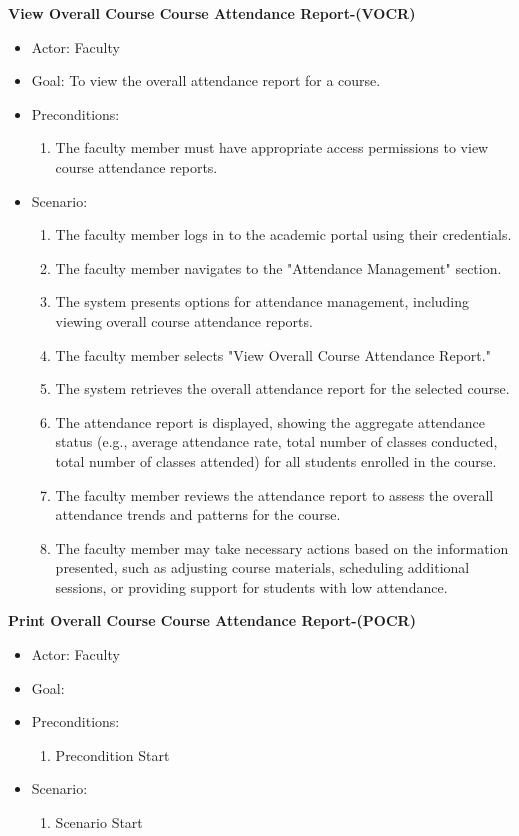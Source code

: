 \documentclass[letterpaper,12pt,oneside,listof=totoc]{scrreprt}
\begin{document}
\hfill \break
\textbf{View Overall Course Course Attendance Report-(VOCR)}
\begin{itemize}
    \item Actor: Faculty
    \item Goal: To view the overall attendance report for a course.
    \item Preconditions:
    \begin{enumerate}
        \item The faculty member must have appropriate access permissions to view course attendance reports.
    \end{enumerate}
    \item Scenario:
    \begin{enumerate}
        \item The faculty member logs in to the academic portal using their credentials.
        \item The faculty member navigates to the "Attendance Management" section.
        \item The system presents options for attendance management, including viewing overall course attendance reports.
        \item The faculty member selects "View Overall Course Attendance Report."
        \item The system retrieves the overall attendance report for the selected course.
        \item The attendance report is displayed, showing the aggregate attendance status (e.g., average attendance rate, total number of classes conducted, total number of classes attended) for all students enrolled in the course.
        \item The faculty member reviews the attendance report to assess the overall attendance trends and patterns for the course.
        \item The faculty member may take necessary actions based on the information presented, such as adjusting course materials, scheduling additional sessions, or providing support for students with low attendance.
    \end{enumerate}
\end{itemize}

\hfill \break
\textbf{Print Overall Course Course Attendance Report-(POCR)}
\begin{itemize}
    \item Actor: Faculty
    \item Goal:
    \item Preconditions:
    \begin{enumerate}
        \item Precondition Start
    \end{enumerate}
    \item Scenario:
    \begin{enumerate}
        \item Scenario Start
    \end{enumerate}
\end{itemize}
\end{document}
